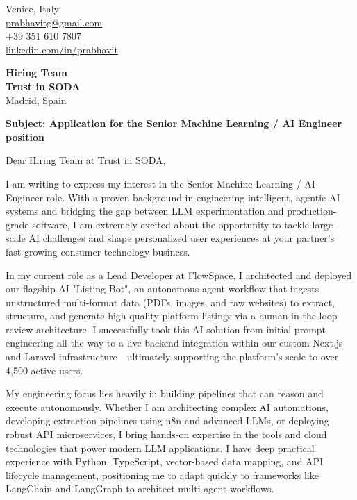 \documentclass[11pt,a4paper]{article}
\begin{document}
\pagestyle{empty}
\onehalfspacing

\begin{flushright}
Venice, Italy\\
\href{mailto:prabhavitg@gmail.com}{prabhavitg@gmail.com}\\
+39 351 610 7807\\
\href{https://www.linkedin.com/in/prabhavit/}{linkedin.com/in/prabhavit}
\end{flushright}

\vspace{1cm}

\noindent
\textbf{Hiring Team}\\
\textbf{Trust in SODA}\\
Madrid, Spain

\vspace{0.5cm}

\noindent
\textbf{Subject: Application for the Senior Machine Learning / AI Engineer position}

\vspace{0.5cm}

\noindent
Dear Hiring Team at Trust in SODA,

\vspace{0.3cm}

\noindent
I am writing to express my interest in the Senior Machine Learning / AI Engineer role. With a proven background in engineering intelligent, agentic AI systems and bridging the gap between LLM experimentation and production-grade software, I am extremely excited about the opportunity to tackle large-scale AI challenges and shape personalized user experiences at your partner's fast-growing consumer technology business.

\vspace{0.3cm}

\noindent
In my current role as a Lead Developer at FlowSpace, I architected and deployed our flagship AI "Listing Bot", an autonomous agent workflow that ingests unstructured multi-format data (PDFs, images, and raw websites) to extract, structure, and generate high-quality platform listings via a human-in-the-loop review architecture. I successfully took this AI solution from initial prompt engineering all the way to a live backend integration within our custom Next.js and Laravel infrastructure—ultimately supporting the platform’s scale to over 4,500 active users. 

\vspace{0.3cm}

\noindent
My engineering focus lies heavily in building pipelines that can reason and execute autonomously. Whether I am architecting complex AI automations, developing extraction pipelines using n8n and advanced LLMs, or deploying robust API microservices, I bring hands-on expertise in the tools and cloud technologies that power modern LLM applications. I have deep practical experience with Python, TypeScript, vector-based data mapping, and API lifecycle management, positioning me to adapt quickly to frameworks like LangChain and LangGraph to architect multi-agent workflows.
\end{document}
